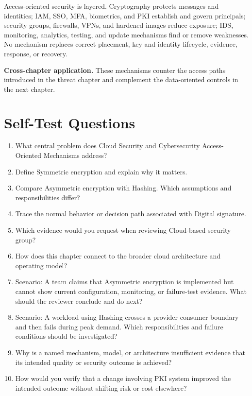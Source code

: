 \documentclass[11pt]{article}
\begin{document}
\begin{synthesisbox}
Access-oriented security is layered. Cryptography protects messages and identities; IAM, SSO, MFA, biometrics, and PKI establish and govern principals; security groups, firewalls, VPNs, and hardened images reduce exposure; IDS, monitoring, analytics, testing, and update mechanisms find or remove weaknesses. No mechanism replaces correct placement, key and identity lifecycle, evidence, response, or recovery.
\par\smallskip
\textbf{Cross-chapter application.} These mechanisms counter the access paths introduced in the threat chapter and complement the data-oriented controls in the next chapter.
\end{synthesisbox}
\section{Self-Test Questions}
\begin{enumerate}
\item What central problem does Cloud Security and Cybersecurity Access-Oriented Mechanisms address?
\item Define Symmetric encryption and explain why it matters.
\item Compare Asymmetric encryption with Hashing. Which assumptions and responsibilities differ?
\item Trace the normal behavior or decision path associated with Digital signature.
\item Which evidence would you request when reviewing Cloud-based security group?
\item How does this chapter connect to the broader cloud architecture and operating model?
\item Scenario: A team claims that Asymmetric encryption is implemented but cannot show current configuration, monitoring, or failure-test evidence. What should the reviewer conclude and do next?
\item Scenario: A workload using Hashing crosses a provider-consumer boundary and then fails during peak demand. Which responsibilities and failure conditions should be investigated?
\item Why is a named mechanism, model, or architecture insufficient evidence that its intended quality or security outcome is achieved?
\item How would you verify that a change involving PKI system improved the intended outcome without shifting risk or cost elsewhere?
\end{enumerate}
\clearpage
\end{document}

